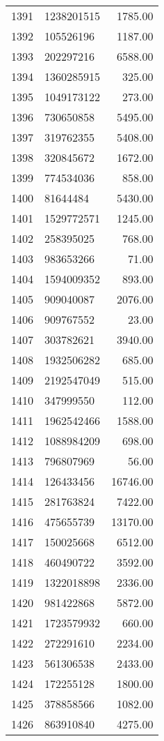 \begin{table}[ht]
\begin{tabular}{rlr}
  1391 & 1238201515 & 1785.00 \\ 
  1392 & 105526196 & 1187.00 \\ 
  1393 & 202297216 & 6588.00 \\ 
  1394 & 1360285915 & 325.00 \\ 
  1395 & 1049173122 & 273.00 \\ 
  1396 & 730650858 & 5495.00 \\ 
  1397 & 319762355 & 5408.00 \\ 
  1398 & 320845672 & 1672.00 \\ 
  1399 & 774534036 & 858.00 \\ 
  1400 & 81644484 & 5430.00 \\ 
  1401 & 1529772571 & 1245.00 \\ 
  1402 & 258395025 & 768.00 \\ 
  1403 & 983653266 & 71.00 \\ 
  1404 & 1594009352 & 893.00 \\ 
  1405 & 909040087 & 2076.00 \\ 
  1406 & 909767552 & 23.00 \\ 
  1407 & 303782621 & 3940.00 \\ 
  1408 & 1932506282 & 685.00 \\ 
  1409 & 2192547049 & 515.00 \\ 
  1410 & 347999550 & 112.00 \\ 
  1411 & 1962542466 & 1588.00 \\ 
  1412 & 1088984209 & 698.00 \\ 
  1413 & 796807969 & 56.00 \\ 
  1414 & 126433456 & 16746.00 \\ 
  1415 & 281763824 & 7422.00 \\ 
  1416 & 475655739 & 13170.00 \\ 
  1417 & 150025668 & 6512.00 \\ 
  1418 & 460490722 & 3592.00 \\ 
  1419 & 1322018898 & 2336.00 \\ 
  1420 & 981422868 & 5872.00 \\ 
  1421 & 1723579932 & 660.00 \\ 
  1422 & 272291610 & 2234.00 \\ 
  1423 & 561306538 & 2433.00 \\ 
  1424 & 172255128 & 1800.00 \\ 
  1425 & 378858566 & 1082.00 \\ 
  1426 & 863910840 & 4275.00 \\ 

\end{tabular}
\end{table}
